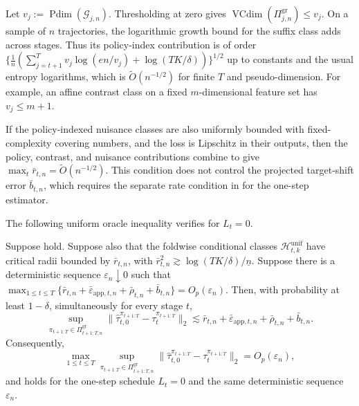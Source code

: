 \documentclass[opre,nonblindrev]{informs4}
\providecommand{\cG}{\mathcal G}
\newcommand{\norm}[1]{\lVert#1\rVert}
\newcommand{\blipadv}{\tau}
\begin{document}
\begin{remark}
\label{rem:pdim-global}
Let $v_j:=\operatorname{Pdim}(\cG_{j,n})$. Thresholding at zero
gives $\operatorname{VCdim}(\Pi_{j,n}^{\mathrm{gr}})\leq v_j$. On a sample of $n$
trajectories, the logarithmic growth bound for the suffix class adds across
stages. Thus its policy-index contribution is of order
$\{\frac{1}{n}({\sum_{j=t+1}^T v_j\log(en/v_j)+\log(TK/\delta)})\}^{1/2}$
up to constants and the usual entropy logarithms, which is
$\widetilde O(n^{-1/2})$ for finite $T$ and pseudo-dimension.
For example, an affine contrast class on a fixed
$m$-dimensional feature set has $v_j\leq m+1$.

If the policy-indexed nuisance classes are also uniformly bounded with
fixed-complexity covering numbers, and the loss is Lipschitz in their outputs,
then the policy, contrast, and nuisance contributions combine to give
$\max_t\bar r_{t,n}=\widetilde O(n^{-1/2})$. This condition does not control
the projected target-shift error $\bar b_{t,n}$, which requires the separate
rate condition in  for the one-step estimator.
\end{remark}

  The following uniform oracle inequality verifies  for
  $L_t=0$.

\begin{proposition}
\label{prop:uniform-one-step}
Suppose  hold. Suppose also that the
foldwise conditional classes
$\mathcal H_{t,k}^{\mathrm{unif}}$ have critical radii bounded by
$\bar r_{t,n}$, with
$\bar r_{t,n}^2\gtrsim\log(TK/\delta)/\underline n$. Suppose there is a
deterministic sequence $\varepsilon_n\downarrow0$ such that
$\max_{1\leq t\leq T}\{\bar r_{t,n}+\bar\varepsilon_{\mathrm{app},t,n}
+\bar\rho_{t,n}+\bar b_{t,n}\}=O_p(\varepsilon_n)$.
Then, with probability at least $1-\delta$, simultaneously for every stage $t$,
\[
\sup_{\pi_{t+1:T}\in\Pi_{t+1:T,n}^{\mathrm{gr}}}
\norm{
\hat\blipadv_{t,0}^{\pi_{t+1:T}}
-\blipadv_t^{\pi_{t+1:T}}
}_2
\lesssim
\bar r_{t,n}+\bar\varepsilon_{\mathrm{app},t,n}+\bar\rho_{t,n}+\bar b_{t,n}.
\]
Consequently,
\[
\max_{1\leq t\leq T}
\sup_{\pi_{t+1:T}\in\Pi_{t+1:T,n}^{\mathrm{gr}}}
\norm{
\hat\blipadv_{t,0}^{\pi_{t+1:T}}
-\blipadv_t^{\pi_{t+1:T}}
}_2
=O_p(\varepsilon_n),
\]
and  holds for the one-step schedule $L_t=0$ and the
same deterministic sequence $\varepsilon_n$.
\end{proposition}
\end{document}
